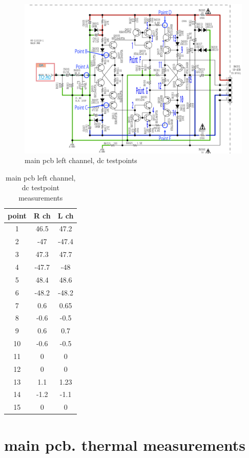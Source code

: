 \documentclass[a4paper,twoside,notitlepage]{article}
\begin{document}
\begin{figure}[hptb!]
    \centering
    \includegraphics[width=12cm]{img_report/dc_testpoints}
 \caption{main pcb left channel, dc testpoints}
 \label{fig:dc-testpoints}
\end{figure}

\begin{table}[hptb!]
\centering
\begin{tabular}{ c | c | c }
    point & R ch & L ch\\ \hline
    1 & 46.5 & 47.2 \\
    2 & -47 & -47.4 \\
    3 & 47.3 & 47.7 \\
    4 & -47.7 & -48 \\
    5 & 48.4 & 48.6 \\
    6 & -48.2 & -48.2 \\
    7 & 0.6 & 0.65 \\
    8 & -0.6 & -0.5 \\
    9 & 0.6 & 0.7 \\
    10 & -0.6 & -0.5 \\
    11 & 0 & 0 \\
    12 & 0 & 0 \\
    13 & 1.1 & 1.23 \\
    14 & -1.2 & -1.1 \\
    15 & 0 & 0 \\
 \end{tabular}
 \caption{main pcb left channel, dc testpoint measurements}
 \label{tab:dc-testpoints-meas}
\end{table}

\clearpage
\section{main pcb. thermal measurements} \label{sec:thermal-measurements}
\end{document}
